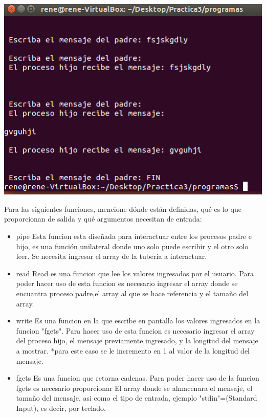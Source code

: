 \begin{center}
		\includegraphics{imagenes/Captura4.png}
	\end{center}

	
	
	Para las siguientes funciones, mencione dónde están definidas, qué es lo que proporcionan de salida y qué argumentos necesitan de entrada:

	\begin{itemize}
		\item pipe 
		Esta funcion esta diseñada para interactuar entre los procesos padre e hijo, es una función unilateral donde uno solo puede escribir y el otro solo leer.
		Se necesita ingresar el array de la tuberia a interactuar.
		\item read
		 Read es una funcion que lee los valores ingresados por el usuario.
		Para poder  hacer uso de esta funcion es necesario ingresar el array donde se encuantra proceso padre,el array al que se hace referencia y el tamaño del array.
		\item write 
		Es una funcion en la que escribe en pantalla los valores ingresados en la funcion "fgets".
		Para hacer uso de esta funcion es necesario ingresar el array del proceso hijo, el mensaje previamente ingresado, y la longitud del mensaje a mostrar.
		*para este caso se le incremento en 1 al valor de la longitud del mensaje.
		\item fgets
		 Es una funcion que retorna  cadenas.
		Para poder hacer uso de la funcion fgets es necesario proporcionar El array donde se almacenara el mensaje, el tamaño del mensaje, asi como el tipo de entrada, ejemplo "stdin"=(Standard Input), es decir, por teclado.

	\end{itemize}

